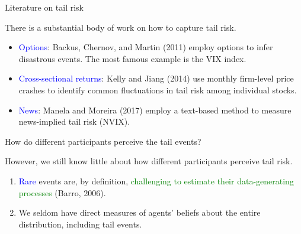 \documentclass[11pt, aspectratio=169]{beamer}
\newenvironment{wideitemize}{\itemize\addtolength{\itemsep}{10pt}}{\enditemize}
\begin{document}
\begin{frame}{Literature on tail risk}
    \begin{wideitemize}
    \item There is a substantial body of work on how to capture tail risk.
    \bigskip
    \begin{itemize}
        \item \textcolor{blue}{Options}: Backus, Chernov, and Martin (2011) employ options to infer disastrous events. The most famous example is the VIX index.
    \bigskip
        \item \textcolor{blue}{Cross-sectional returns}: Kelly and Jiang (2014) use monthly firm-level price crashes to identify common fluctuations in tail risk among individual stocks.
    \bigskip
        \item \textcolor{blue}{News}: Manela and Moreira (2017) employ a text-based method to measure news-implied tail risk (NVIX).
    \end{itemize}
    \end{wideitemize}
\end{frame}

\begin{frame}{How do different participants perceive the tail events?}
    \bigskip
    \begin{wideitemize}
    \item However, \alert{we still know little about how different participants perceive tail risk.}
    \bigskip
    \begin{enumerate}
    \item \textcolor{blue}{Rare} events are, by definition, \textcolor{green}{challenging to estimate their data-generating processes} (Barro, 2006).
    \bigskip  
    \item We seldom have direct measures of agents' beliefs about the entire distribution, including \alert{tail events}. 
    \end{enumerate}
    \end{wideitemize}
\end{frame}
\end{document}
